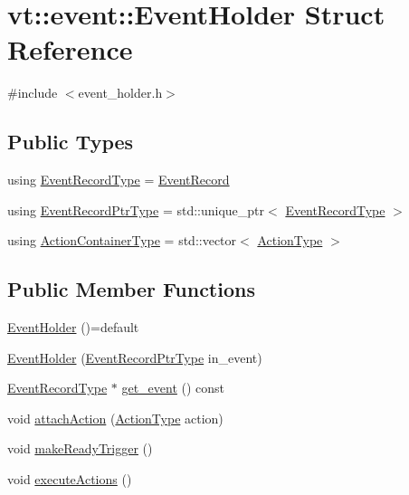 \hypertarget{structvt_1_1event_1_1_event_holder}{}\section{vt\+:\+:event\+:\+:Event\+Holder Struct Reference}
\label{structvt_1_1event_1_1_event_holder}


{\ttfamily \#include $<$event\+\_\+holder.\+h$>$}

\subsection*{Public Types}
\begin{DoxyCompactItemize}
\item 
using \hyperlink{structvt_1_1event_1_1_event_holder_adfdec23d67b016b1f028694d5ca5bcff}{Event\+Record\+Type} = \hyperlink{structvt_1_1event_1_1_event_record}{Event\+Record}
\item 
using \hyperlink{structvt_1_1event_1_1_event_holder_a89949c85549018aad229356105187d50}{Event\+Record\+Ptr\+Type} = std\+::unique\+\_\+ptr$<$ \hyperlink{structvt_1_1event_1_1_event_holder_adfdec23d67b016b1f028694d5ca5bcff}{Event\+Record\+Type} $>$
\item 
using \hyperlink{structvt_1_1event_1_1_event_holder_ae0e2d5fe3bd5792118116105a0a09db7}{Action\+Container\+Type} = std\+::vector$<$ \hyperlink{namespacevt_ae0a5a7b18cc99d7b732cb4d44f46b0f3}{Action\+Type} $>$
\end{DoxyCompactItemize}
\subsection*{Public Member Functions}
\begin{DoxyCompactItemize}
\item 
\hyperlink{structvt_1_1event_1_1_event_holder_aba66e34b2e3f90d418430be281ccb9b1}{Event\+Holder} ()=default
\item 
\hyperlink{structvt_1_1event_1_1_event_holder_a11cef5f8c68e7052e0756c0a7506a278}{Event\+Holder} (\hyperlink{structvt_1_1event_1_1_event_holder_a89949c85549018aad229356105187d50}{Event\+Record\+Ptr\+Type} in\+\_\+event)
\item 
\hyperlink{structvt_1_1event_1_1_event_holder_adfdec23d67b016b1f028694d5ca5bcff}{Event\+Record\+Type} $\ast$ \hyperlink{structvt_1_1event_1_1_event_holder_ac679f89c2b133834d0a10181a80c5d47}{get\+\_\+event} () const
\item 
void \hyperlink{structvt_1_1event_1_1_event_holder_aa5563adb9da7193d0a8260424d756c51}{attach\+Action} (\hyperlink{namespacevt_ae0a5a7b18cc99d7b732cb4d44f46b0f3}{Action\+Type} action)
\item 
void \hyperlink{structvt_1_1event_1_1_event_holder_a6a9295755ee849b769c7e5ad1c25ee08}{make\+Ready\+Trigger} ()
\item 
void \hyperlink{structvt_1_1event_1_1_event_holder_a39cab4f8ac00152657fcb2e49497f049}{execute\+Actions} ()
\end{DoxyCompactItemize}

